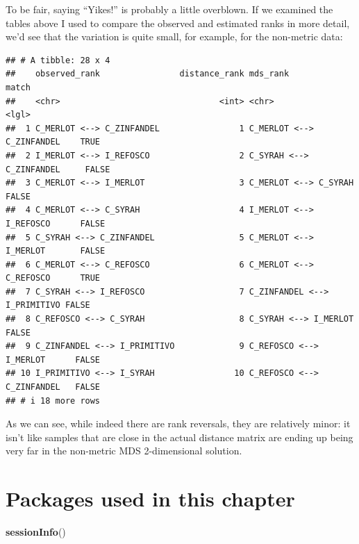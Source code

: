 \documentclass[
]{book}
\newenvironment{Shaded}{\begin{snugshade}}{\end{snugshade}}
\newcommand{\FunctionTok}[1]{\textcolor[rgb]{0.13,0.29,0.53}{\textbf{#1}}}
\newcommand{\NormalTok}[1]{#1}
\begin{document}
To be fair, saying ``Yikes!'' is probably a little overblown. If we examined the tables above I used to compare the observed and estimated ranks in more detail, we'd see that the variation is quite small, for example, for the non-metric data:

\begin{verbatim}
## # A tibble: 28 x 4
##    observed_rank                distance_rank mds_rank                     match
##    <chr>                                <int> <chr>                        <lgl>
##  1 C_MERLOT <--> C_ZINFANDEL                1 C_MERLOT <--> C_ZINFANDEL    TRUE 
##  2 I_MERLOT <--> I_REFOSCO                  2 C_SYRAH <--> C_ZINFANDEL     FALSE
##  3 C_MERLOT <--> I_MERLOT                   3 C_MERLOT <--> C_SYRAH        FALSE
##  4 C_MERLOT <--> C_SYRAH                    4 I_MERLOT <--> I_REFOSCO      FALSE
##  5 C_SYRAH <--> C_ZINFANDEL                 5 C_MERLOT <--> I_MERLOT       FALSE
##  6 C_MERLOT <--> C_REFOSCO                  6 C_MERLOT <--> C_REFOSCO      TRUE 
##  7 C_SYRAH <--> I_REFOSCO                   7 C_ZINFANDEL <--> I_PRIMITIVO FALSE
##  8 C_REFOSCO <--> C_SYRAH                   8 C_SYRAH <--> I_MERLOT        FALSE
##  9 C_ZINFANDEL <--> I_PRIMITIVO             9 C_REFOSCO <--> I_MERLOT      FALSE
## 10 I_PRIMITIVO <--> I_SYRAH                10 C_REFOSCO <--> C_ZINFANDEL   FALSE
## # i 18 more rows
\end{verbatim}

As we can see, while indeed there are rank reversals, they are relatively minor: it isn't like samples that are close in the actual distance matrix are ending up being very far in the non-metric MDS 2-dimensional solution.

\section{Packages used in this chapter}\label{packages-used-in-this-chapter-7}

\begin{Shaded}
\begin{Highlighting}[]
\FunctionTok{sessionInfo}\NormalTok{()}
\end{Highlighting}
\end{Shaded}
\end{document}
